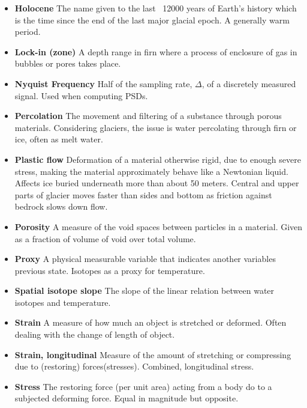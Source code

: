 \documentclass[11pt]{article}
\begin{document}
\begin{itemize}
	\item \textbf{Holocene} The name given to the last ~12000 years of Earth's history which is the time since the end of the last major glacial epoch. A generally warm period.
	
	\item \textbf{Lock-in (zone)} A depth range in firn where a process of enclosure of gas in bubbles or pores takes place.
	
	\item \textbf{Nyquist Frequency} Half of the sampling rate, $\Delta$, of a discretely measured signal. Used when computing PSDs.
	
	\item \textbf{Percolation} The movement and filtering of a substance through porous materials. Considering glaciers, the issue is water percolating through firn or ice, often as melt water.	
	
	\item \textbf{Plastic flow} Deformation of a material otherwise rigid, due to enough severe stress, making the material approximately behave like a Newtonian liquid. Affects ice buried underneath more than about 50 meters. Central and upper parts of glacier moves faster than sides and bottom as friction against bedrock slows down flow.
	
	\item \textbf{Porosity} A measure of the void spaces between particles in a material. Given as a fraction of volume of void over total volume.
	
	\item \textbf{Proxy} A physical measurable variable that indicates another variables previous state. Isotopes as a proxy for temperature. 
	
	\item \textbf{Spatial isotope slope} The slope of the linear relation between water isotopes and temperature.
	
	\item \textbf{Strain} A measure of how much an object is stretched or deformed. Often dealing with the change of length of object.
	
	\item \textbf{Strain, longitudinal} Measure of the amount of stretching or compressing due to (restoring) forces(stresses). Combined, longitudinal stress.
	
	\item \textbf{Stress} The restoring force (per unit area) acting from a body do to a subjected deforming force. Equal in magnitude but opposite.
\end{itemize}
\end{document}
